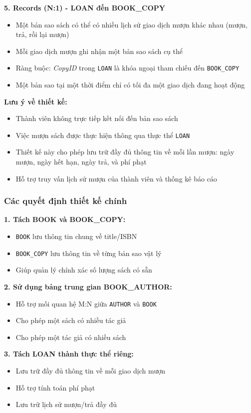 \documentclass[12pt,a4paper]{article}
\newcommand{\entity}[1]{\texttt{#1}}
\newcommand{\attr}[1]{\textit{#1}}
\begin{document}
\textbf{5. Records (N:1) - LOAN đến BOOK\_COPY}
\begin{itemize}
    \item Một bản sao sách có thể có nhiều lịch sử giao dịch mượn khác nhau (mượn, trả, rồi lại mượn)
    \item Mỗi giao dịch mượn ghi nhận một bản sao sách cụ thể
    \item Ràng buộc: \attr{CopyID} trong \entity{LOAN} là khóa ngoại tham chiếu đến \entity{BOOK\_COPY}
    \item Một bản sao tại một thời điểm chỉ có tối đa một giao dịch đang hoạt động
\end{itemize}

\textbf{Lưu ý về thiết kế:}
\begin{itemize}
    \item Thành viên không trực tiếp kết nối đến bản sao sách
    \item Việc mượn sách được thực hiện thông qua thực thể \entity{LOAN}
    \item Thiết kế này cho phép lưu trữ đầy đủ thông tin về mỗi lần mượn: ngày mượn, ngày hết hạn, ngày trả, và phí phạt
    \item Hỗ trợ truy vấn lịch sử mượn của thành viên và thống kê báo cáo
\end{itemize}

\subsubsection{Các quyết định thiết kế chính}

\textbf{1. Tách BOOK và BOOK\_COPY:}
\begin{itemize}
    \item \entity{BOOK} lưu thông tin chung về title/ISBN
    \item \entity{BOOK\_COPY} lưu thông tin về từng bản sao vật lý
    \item Giúp quản lý chính xác số lượng sách có sẵn
\end{itemize}

\textbf{2. Sử dụng bảng trung gian BOOK\_AUTHOR:}
\begin{itemize}
    \item Hỗ trợ mối quan hệ M:N giữa \entity{AUTHOR} và \entity{BOOK}
    \item Cho phép một sách có nhiều tác giả
    \item Cho phép một tác giả có nhiều sách
\end{itemize}

\textbf{3. Tách LOAN thành thực thể riêng:}
\begin{itemize}
    \item Lưu trữ đầy đủ thông tin về mỗi giao dịch mượn
    \item Hỗ trợ tính toán phí phạt
    \item Lưu trữ lịch sử mượn/trả đầy đủ
\end{itemize}
\end{document}

